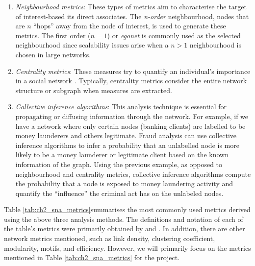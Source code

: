 \begin{enumerate}
    \item \textit{Neighbourhood metrics}: These types of metrics aim to characterise the target of interest-based its direct associates. The \textit{n-order} neighbourhood, nodes that are $n$ ``hops'' away from the node of interest, is used to generate these metrics. The first order ($n = 1$) or \textit{egonet} is commonly used as the selected neighbourhood since scalability issues arise when a $n > 1$ neighbourhood is chosen in large networks.   
    \item \textit{Centrality metrics}: These measures try to quantify an individual's importance in a social network \citep{boccaletti2006complex}. Typically, centrality metrics consider the entire network structure or subgraph when measures are extracted. 
    \item \textit{Collective inference algorithms}: This analysis technique is essential for propagating or diffusing information through the network. For example, if we have a network where only certain nodes (banking clients) are labelled to be money launderers and others legitimate.  Fraud analysis can use collective inference algorithms to infer a probability that an unlabelled node is more likely to be a  money launderer or legitimate client based on the known information of the graph. Using the previous example, as opposed to neighbourhood and centrality metrics, collective inference algorithms compute the probability that a node is exposed to money laundering activity and quantify the ``influence'' the criminal act has on the unlabeled nodes.    
\end{enumerate}

Table \ref{tab:ch2_sna_metrics}summarises the most commonly used metrics derived using the above three analysis methods. The definitions and notation of each of the table's metrics were primarily obtained by \citet{boccaletti2006complex, baesens2015fraud,} and \citet*{humpherys2017foundations}. In addition, there are other network metrics mentioned, such as link density, clustering coefficient, modularity, motifs, and efficiency. However, we will primarily focus on the metrics mentioned in Table \ref{tab:ch2_sna_metrics} for the project. 

